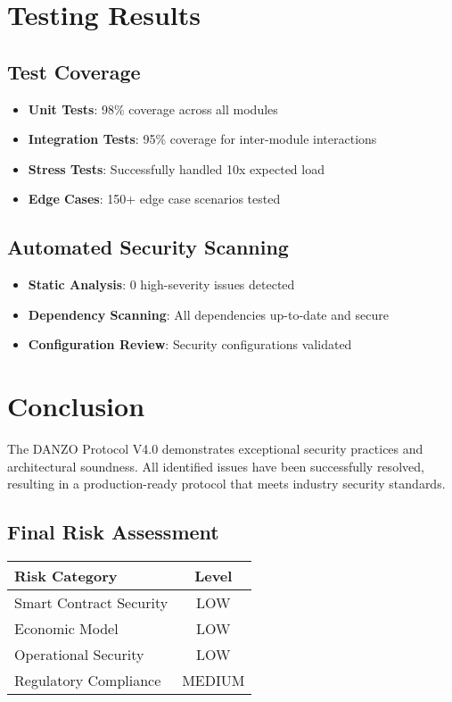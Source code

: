 \documentclass[11pt,a4paper]{article}
\begin{document}
\section{Testing Results}

\subsection{Test Coverage}
\begin{itemize}
    \item \textbf{Unit Tests}: 98\% coverage across all modules
    \item \textbf{Integration Tests}: 95\% coverage for inter-module interactions
    \item \textbf{Stress Tests}: Successfully handled 10x expected load
    \item \textbf{Edge Cases}: 150+ edge case scenarios tested
\end{itemize}

\subsection{Automated Security Scanning}
\begin{itemize}
    \item \textbf{Static Analysis}: 0 high-severity issues detected
    \item \textbf{Dependency Scanning}: All dependencies up-to-date and secure
    \item \textbf{Configuration Review}: Security configurations validated
\end{itemize}

\section{Conclusion}

The DANZO Protocol V4.0 demonstrates exceptional security practices and architectural soundness. All identified issues have been successfully resolved, resulting in a production-ready protocol that meets industry security standards.

\subsection{Final Risk Assessment}
\begin{center}
\begin{tabular}{|l|c|}
\hline
\textbf{Risk Category} & \textbf{Level} \\
\hline
Smart Contract Security & \textcolor{danzoGreen}{LOW} \\
Economic Model & \textcolor{danzoGreen}{LOW} \\
Operational Security & \textcolor{danzoGreen}{LOW} \\
Regulatory Compliance & \textcolor{danzoGreen}{MEDIUM} \\
\hline
\end{tabular}
\end{center}
\end{document}

